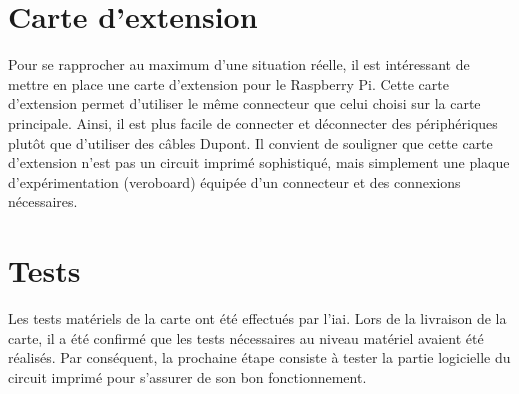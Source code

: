 \section{Carte d'extension}

Pour se rapprocher au maximum d'une situation réelle, il est intéressant de mettre en place une carte d'extension pour le Raspberry Pi.
Cette carte d'extension permet d'utiliser le même connecteur que celui choisi sur la carte principale.
Ainsi, il est plus facile de connecter et déconnecter des périphériques plutôt que d'utiliser des câbles Dupont.
Il convient de souligner que cette carte d'extension n'est pas un circuit imprimé sophistiqué, mais simplement une plaque d'expérimentation (veroboard) équipée d'un connecteur et des connexions nécessaires.

\section{Tests}

Les tests matériels de la carte ont été effectués par l'\gls{iai}.
Lors de la livraison de la carte, il a été confirmé que les tests nécessaires au niveau matériel avaient été réalisés.
Par conséquent, la prochaine étape consiste à tester la partie logicielle du circuit imprimé pour s'assurer de son bon fonctionnement.

